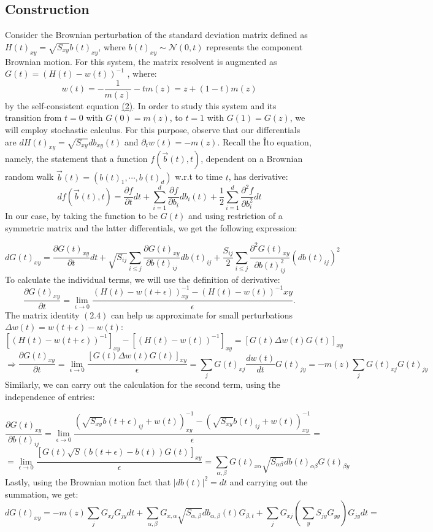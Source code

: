 \documentclass[11pt]{article}
\begin{document}
\subsection{Construction}
\noindent Consider the Brownian perturbation of the standard deviation matrix defined as $H(t)_{xy} = \sqrt{S_{xy}}b(t)_{xy}$, where $b(t)_{xy}\sim \mathcal{N}(0, t)$ represents the component Brownian motion. For this system, the matrix resolvent is augmented as $G(t) = (H(t)-w(t))^{-1}$ , where: \begin{equation*}
w(t) = -\frac{1}{m(z)}-tm(z) = z+(1-t)m(z) \tag{3}
\end{equation*}
by the self-consistent equation \hyperref[self-consistent]{(2)}. In order to study this system and its transition from $t=0$ with $G(0) = m(z)$, to $t=1$ with $G(1)=G(z)$, we will employ stochastic calculus. For this purpose, observe that our differentials are $dH(t)_{xy} = \sqrt{S_{xy}}db_{xy}(t)$ and $\partial_tw(t) = -m(z)$. Recall the Îto equation, namely, the statement that a function $f(\vec{b}(t), t)$, dependent on a Brownian random walk  $\vec{b}(t) = (b(t)_1, \cdots, b(t)_d)$ w.r.t to time $t$, has derivative:
$$df(\vec{b}(t), t) = \frac{\partial f}{\partial t}dt + \sum_{i=1}^d \frac{\partial f}{\partial b_i}db_i(t) + \frac{1}{2}\sum_{i=1}^d \frac{\partial^2 f}{\partial b_i^2} dt$$
In our case, by taking the function to be $G(t)$ and using restriction of a symmetric matrix and the latter differentials, we get the following expression:

$$dG(t)_{xy} = \frac{\partial G(t)_{xy}}{\partial t}dt +\sqrt{S_{ij}}\sum_{i\leq j}\frac{\partial G(t)_{xy}}{\partial b(t)_{ij}}db(t)_{ij}
+\frac{S_{ij}}{2}\sum_{i\leq j}\frac{\partial^2 G(t)_{xy}}{\partial b(t)_{ij}^2}(db(t)_{ij})^2$$
To calculate the individual terms, we will use the definition of derivative:
$$\frac{\partial G(t)_{xy}}{\partial t}=\lim_{\epsilon\rightarrow 0}\frac{(H(t)-w(t+\epsilon))^{-1}_{xy}-(H(t)-w(t))^{-1}{xy}}{\epsilon}.$$
The matrix identity $(2.4)$ can help us approximate for small perturbations $\Delta w(t) = w(t+\epsilon)-w(t)$:
$$\left[(H(t)-w(t+\epsilon))^{-1}\right]_{xy}-\left[(H(t)-w(t))^{-1}\right ]_{xy}= \left[ G(t)\Delta w(t) G(t)\right]_{xy}$$$$\Rightarrow \frac{\partial G(t)_{xy}}{\partial t} =\lim_{\epsilon\rightarrow 0} \frac{ \left[ G(t)\Delta w(t) G(t)\right]_{xy}}{\epsilon}=\sum_{j}G(t)_{xj}\frac{dw(t)}{dt}G(t)_{jy}= -m(z)\sum_j G(t)_{xj}G(t)_{jy}$$
Similarly, we can carry out the calculation for the second term, using the independence of entries:

$$\frac{\partial G(t)_{xy}}{\partial b(t)_{ij}}= \lim_{\epsilon\rightarrow 0}\frac{(\sqrt{S_{xy}}b(t+\epsilon)_{ij}+w(t))^{-1}_{xy}-(\sqrt{S_{xy}}b(t)_{ij}+w(t))^{-1}_{xy}}{\epsilon}=$$
$$ =\lim_{\epsilon\rightarrow 0}\frac{[G(t)\sqrt{S}(b(t+\epsilon)-b(t))G(t)]_{xy}}{\epsilon}=\sum_{\alpha, \beta}G(t)_{x\alpha}\sqrt{S_{\alpha \beta}}db(t)_{\alpha\beta}G(t)_{\beta y}$$
Lastly, using the Brownian motion fact that $|db(t)|^2=dt$ and carrying out the summation, we get:
$$dG(t)_{xy}=-m(z)\sum_j G_{xj}G_{jy}dt+\sum_{\alpha, \beta}G_{x, \alpha}\sqrt{S_{\alpha, \beta}}db_{\alpha, \beta}(t)G_{\beta, t}+\sum_j G_{xj}\left(\sum_yS_{jy}G_{yy}\right)G_{jy}dt=$$
\end{document}
